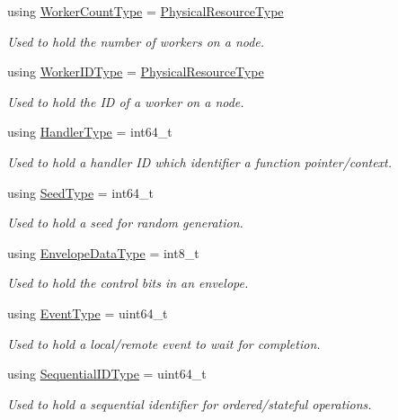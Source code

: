 \begin{DoxyCompactItemize}
using \hyperlink{namespacevt_aa93398ea48f2cb6c188512250f7cc248}{Worker\+Count\+Type} = \hyperlink{namespacevt_a2dc36fcada816dc6d11774d650328ee9}{Physical\+Resource\+Type}
\begin{DoxyCompactList}\small\item\em Used to hold the number of workers on a node. \end{DoxyCompactList}\item 
using \hyperlink{namespacevt_a656e362091da17b9b93d0655b36e3392}{Worker\+I\+D\+Type} = \hyperlink{namespacevt_a2dc36fcada816dc6d11774d650328ee9}{Physical\+Resource\+Type}
\begin{DoxyCompactList}\small\item\em Used to hold the ID of a worker on a node. \end{DoxyCompactList}\item 
using \hyperlink{namespacevt_af64846b57dfcaf104da3ef6967917573}{Handler\+Type} = int64\+\_\+t
\begin{DoxyCompactList}\small\item\em Used to hold a handler ID which identifier a function pointer/context. \end{DoxyCompactList}\item 
using \hyperlink{namespacevt_ae2e13198bdef4d5b8e603d6c1c7f0969}{Seed\+Type} = int64\+\_\+t
\begin{DoxyCompactList}\small\item\em Used to hold a seed for random generation. \end{DoxyCompactList}\item 
using \hyperlink{namespacevt_a2740126d59f361d9ba46f66b3b4b0d3d}{Envelope\+Data\+Type} = int8\+\_\+t
\begin{DoxyCompactList}\small\item\em Used to hold the control bits in an envelope. \end{DoxyCompactList}\item 
using \hyperlink{namespacevt_a009267401def7ae8bf201892222d060f}{Event\+Type} = uint64\+\_\+t
\begin{DoxyCompactList}\small\item\em Used to hold a local/remote event to wait for completion. \end{DoxyCompactList}\item 
using \hyperlink{namespacevt_a3063d4db3b879d6dd2c7b8d50995c7f6}{Sequential\+I\+D\+Type} = uint64\+\_\+t
\begin{DoxyCompactList}\small\item\em Used to hold a sequential identifier for ordered/stateful operations. \end{DoxyCompactList}\item 

\end{DoxyCompactItemize}
